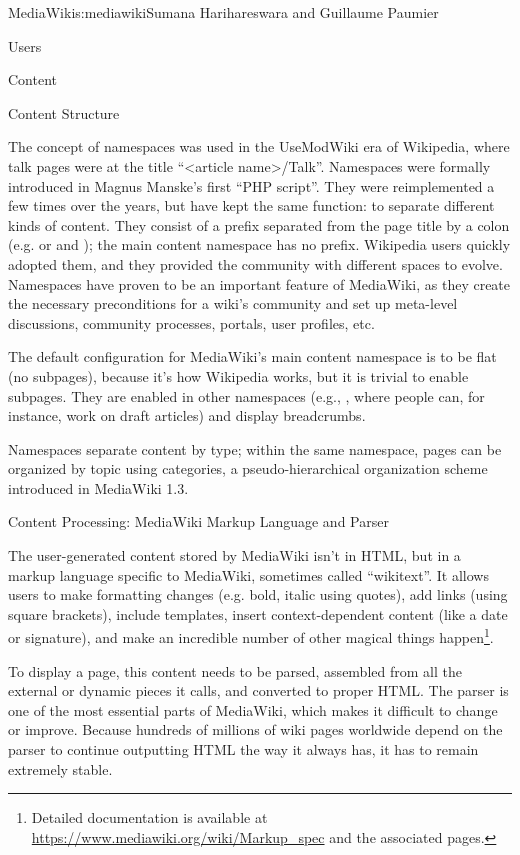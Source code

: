 \begin{aosachapter}{MediaWiki}{s:mediawiki}{Sumana Harihareswara and Guillaume Paumier}
\begin{aosasect1}{Users}
\end{aosasect1}

\begin{aosasect1}{Content}

\begin{aosasect2}{Content Structure}

The concept of namespaces was used in the UseModWiki era of Wikipedia,
where talk pages were at the title ``{\textless}article
name{\textgreater}/Talk''. Namespaces were formally introduced in
Magnus Manske's first ``PHP script''. They were reimplemented a few
times over the years, but have kept the same function: to separate
different kinds of content. They consist of a prefix separated from
the page title by a colon (e.g.  or  and
); the main content namespace has no prefix. Wikipedia
users quickly adopted them, and they provided the community with
different spaces to evolve. Namespaces have proven to be an important
feature of MediaWiki, as they create the necessary preconditions for a
wiki's community and set up meta-level discussions, community
processes, portals, user profiles, etc.

The default configuration for MediaWiki's main content namespace is to
be flat (no subpages), because it's how Wikipedia works, but it is
trivial to enable subpages. They are enabled in other namespaces
(e.g., , where people can, for instance, work on draft
articles) and display breadcrumbs.

Namespaces separate content by type; within the same namespace, pages
can be organized by topic using categories, a pseudo-hierarchical
organization scheme introduced in MediaWiki 1.3.

\end{aosasect2}

\begin{aosasect2}{Content Processing: MediaWiki Markup Language and Parser}

The user-generated content stored by MediaWiki isn't in HTML, but in a
markup language specific to MediaWiki, sometimes called ``wikitext''. It
allows users to make formatting changes (e.g. bold, italic using
quotes), add links (using square brackets), include templates, insert
context-dependent content (like a date or signature), and make an
incredible number of other magical things happen\footnote{Detailed
  documentation is available at
  \url{https://www.mediawiki.org/wiki/Markup_spec} and the associated
  pages.}.

To display a page, this content needs to be parsed, assembled from all
the external or dynamic pieces it calls, and converted to proper
HTML. The parser is one of the most essential parts of MediaWiki,
which makes it difficult to change or improve. Because hundreds
of millions of wiki pages worldwide depend on the parser to continue
outputting HTML the way it always has, it has to remain extremely
stable.


\end{aosasect2}
\end{aosasect1}
\end{aosachapter}
